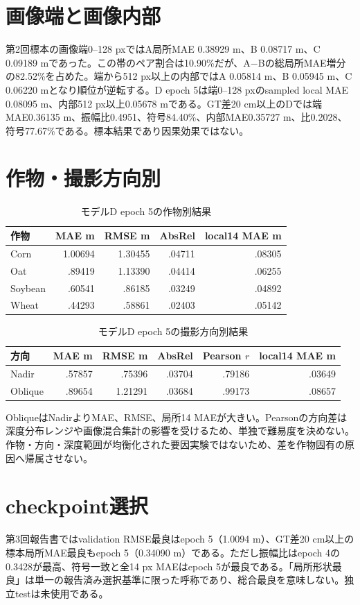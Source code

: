 \section{画像端と画像内部}

第2回標本の画像端0--128 pxではA局所MAE 0.38929 m、B 0.08717 m、C 0.09189 mであった。この帯のペア割合は10.90\%だが、A−Bの総局所MAE増分の82.52\%を占めた。端から512 px以上の内部ではA 0.05814 m、B 0.05945 m、C 0.06220 mとなり順位が逆転する。D epoch 5は端0--128 pxのsampled local MAE 0.08095 m、内部512 px以上0.05678 mである。GT差20 cm以上のDでは端MAE0.36135 m、振幅比0.4951、符号84.40\%、内部MAE0.35727 m、比0.2028、符号77.67\%である。標本結果であり因果効果ではない。
\section{作物・撮影方向別}
\begin{table}[H]\centering\small
\caption{モデルD epoch 5の作物別結果}\label{tab:crop}
\begin{tabular}{lrrrr}\toprule 作物&MAE m&RMSE m&AbsRel&local14 MAE m\\\midrule
Corn&1.00694&1.30455&.04711&.08305\\
Oat&.89419&1.13390&.04414&.06255\\
Soybean&.60541&.86185&.03249&.04892\\
Wheat&.44293&.58861&.02403&.05142\\\bottomrule\end{tabular}\end{table}
\begin{table}[H]\centering\small
\caption{モデルD epoch 5の撮影方向別結果}\label{tab:view}
\begin{tabular}{lrrrrr}\toprule 方向&MAE m&RMSE m&AbsRel&Pearson $r$&local14 MAE m\\\midrule
Nadir&.57857&.75396&.03704&.79186&.03649\\
Oblique&.89654&1.21291&.03684&.99173&.08657\\\bottomrule\end{tabular}\end{table}
ObliqueはNadirよりMAE、RMSE、局所14 MAEが大きい。Pearsonの方向差は深度分布レンジや画像混合集計の影響を受けるため、単独で難易度を決めない。作物・方向・深度範囲が均衡化された要因実験ではないため、差を作物固有の原因へ帰属させない。
\section{checkpoint選択}
第3回報告書ではvalidation RMSE最良はepoch 5（1.0094 m）、GT差20 cm以上の標本局所MAE最良もepoch 5（0.34090 m）である。ただし振幅比はepoch 4の0.3428が最高、符号一致と全14 px MAEはepoch 5が最良である。「局所形状最良」は単一の報告済み選択基準に限った呼称であり、総合最良を意味しない。独立testは未使用である。



